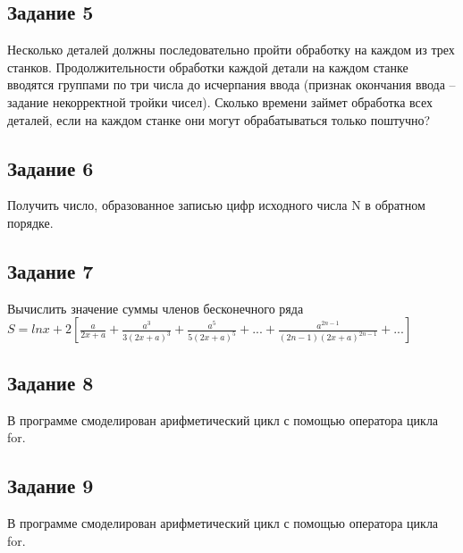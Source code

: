 \documentclass[a4paper,14pt]{extarticle}
\begin{document}
\subsection{Задание 5}
Несколько деталей должны последовательно пройти обработку на каждом из трех станков. Продолжительности обработки каждой детали на каждом станке вводятся группами по три числа до исчерпания ввода (признак окончания ввода – задание некорректной тройки чисел). Сколько времени займет обработка всех деталей, если на каждом станке они могут обрабатываться только поштучно? 


\subsection{Задание 6}
Получить число, образованное записью цифр исходного числа N в обратном порядке. 


\subsection{Задание 7}
Вычислить значение суммы членов бесконечного ряда\\
$S = ln x + 2[\frac {a} {2x+a} + \frac {a^3} {3(2x+a)^3} + \frac {a^5} {5(2x+a)^5}
+ ... + \frac {a^{2n-1}} {(2n-1)(2x+a)^{2n-1}} + ...]$


\subsection{Задание 8}
В программе смоделирован арифметический цикл с помощью оператора цикла for. 


\subsection{Задание 9}
В программе смоделирован арифметический цикл с помощью оператора цикла for. 

\end{document}
